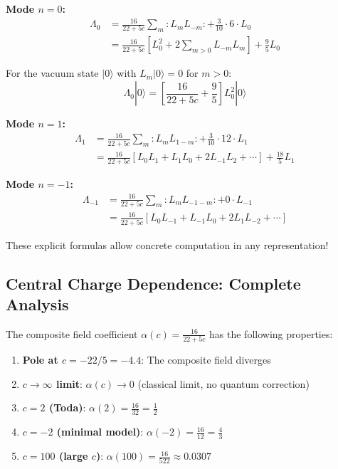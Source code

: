 \begin{computation}\label{comp:lambda-low-modes}

\textbf{Mode $n=0$:}
\begin{align}
\Lambda_0 &= \frac{16}{22+5c} \sum_{m} :L_m L_{-m}: + \frac{3}{10} \cdot 6 \cdot L_0 \\
&= \frac{16}{22+5c} \left[L_0^2 + 2\sum_{m>0} L_{-m}L_m\right] + \frac{9}{5} L_0
\end{align}

For the vacuum state $|0\rangle$ with $L_m|0\rangle = 0$ for $m > 0$:
$$\Lambda_0|0\rangle = \left[\frac{16}{22+5c} + \frac{9}{5}\right] L_0^2|0\rangle$$

\textbf{Mode $n=1$:}
\begin{align}
\Lambda_1 &= \frac{16}{22+5c} \sum_m :L_m L_{1-m}: + \frac{3}{10} \cdot 12 \cdot L_1 \\
&= \frac{16}{22+5c} [L_0 L_1 + L_1 L_0 + 2L_{-1}L_2 + \cdots] + \frac{18}{5} L_1
\end{align}

\textbf{Mode $n=-1$:}
\begin{align}
\Lambda_{-1} &= \frac{16}{22+5c} \sum_m :L_m L_{-1-m}: + 0 \cdot L_{-1} \\
&= \frac{16}{22+5c} [L_0 L_{-1} + L_{-1} L_0 + 2L_1 L_{-2} + \cdots]
\end{align}

These explicit formulas allow concrete computation in any representation!
\end{computation}

\subsection{Central Charge Dependence: Complete Analysis}
\label{subsec:c-dependence-analysis}

\begin{theorem}\label{thm:c-scaling}
The composite field coefficient $\alpha(c) = \frac{16}{22+5c}$ has the following properties:
\begin{enumerate}
\item \textbf{Pole at $c = -22/5 = -4.4$}: The composite field diverges
\item \textbf{$c \to \infty$ limit}: $\alpha(c) \to 0$ (classical limit, no quantum correction)
\item \textbf{$c = 2$ (Toda)}: $\alpha(2) = \frac{16}{32} = \frac{1}{2}$
\item \textbf{$c = -2$ (minimal model)}: $\alpha(-2) = \frac{16}{12} = \frac{4}{3}$
\item \textbf{$c = 100$ (large $c$)}: $\alpha(100) = \frac{16}{522} \approx 0.0307$
\end{enumerate}
\end{theorem}

